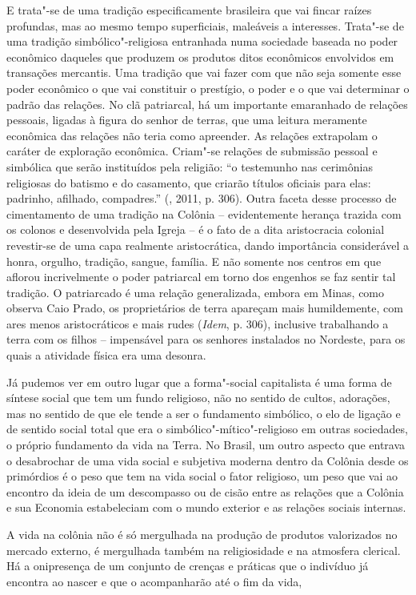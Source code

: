E trata"-se de uma tradição especificamente brasileira que vai fincar
raízes profundas, mas ao mesmo tempo superficiais, maleáveis a
interesses. Trata"-se de uma tradição simbólico"-religiosa entranhada numa
sociedade baseada no poder econômico daqueles que produzem os produtos
ditos econômicos envolvidos em transações mercantis. Uma tradição que
vai fazer com que não seja somente esse poder econômico o que vai
constituir o prestígio, o poder e o que vai determinar o padrão das
relações. No clã patriarcal, há um importante emaranhado de relações
pessoais, ligadas à figura do senhor de terras, que uma leitura
meramente econômica das relações não teria como apreender. As relações
extrapolam o caráter de exploração econômica. Criam"-se relações de
submissão pessoal e simbólica que serão instituídos pela religião: ``o
testemunho nas cerimônias religiosas do batismo e do casamento, que
criarão títulos oficiais para elas: padrinho, afilhado, compadres.''
(, 2011, p. 306). Outra faceta desse processo de cimentamento de
uma tradição na Colônia -- evidentemente herança trazida com os colonos
e desenvolvida pela Igreja -- é o fato de a dita aristocracia colonial
revestir-se de uma capa realmente aristocrática, dando importância considerável a
honra, orgulho, tradição, sangue, família. E não somente nos centros em
que aflorou incrivelmente o poder patriarcal em torno dos engenhos se
faz sentir tal tradição. O patriarcado é uma relação generalizada,
embora em Minas, como observa Caio Prado, os proprietários de terra
apareçam mais humildemente, com ares menos aristocráticos e mais rudes
(\emph{Idem}, p. 306), inclusive trabalhando a terra com os filhos --
impensável para os senhores instalados no Nordeste, para os quais a
atividade física era uma desonra.

Já pudemos ver em outro lugar que a forma"-social capitalista é uma
forma de síntese social que tem um fundo religioso, não no sentido de
cultos, adorações, mas no sentido de que ele tende a ser o fundamento
simbólico, o elo de ligação e de sentido social total que era o
simbólico"-mítico"-religioso em outras sociedades, o próprio fundamento da
vida na Terra. No Brasil, um outro aspecto que entrava o desabrochar de
uma vida social e subjetiva moderna dentro da Colônia desde os primórdios
é o peso que tem na vida social o fator religioso, um peso que vai ao
encontro da ideia de um descompasso ou de cisão entre as relações que
a Colônia e sua Economia estabeleciam com o mundo exterior e as relações
sociais internas.

A vida na colônia não é só mergulhada na produção de produtos
valorizados no mercado externo, é mergulhada também na religiosidade e
na atmosfera clerical. Há a onipresença de um conjunto de crenças e
práticas que o indivíduo já encontra ao nascer e que o acompanharão até
o fim da vida,

